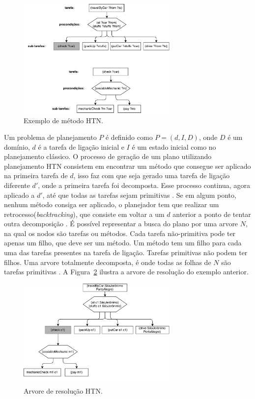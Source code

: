 \begin{figure}[ht]
	\centering
	\includegraphics[width=0.7\textwidth]{fig/htnmethod.pdf}
	\caption{Exemplo de método HTN.}
	\label{fig:htnmethod}
\end{figure} 

Um problema de planejamento $P$ é definido como $P = (d, I, D)$, onde $D$ é um domínio, $d$ é a tarefa de ligação inicial e $I$ é um estado inicial como no planejamento clássico. O processo de geração de um plano utilizando planejamento HTN consistem em encontrar um método que consegue ser aplicado na primeira tarefa de $d$, isso faz com que seja gerado uma tarefa de ligação diferente $d'$, onde a primeira tarefa foi decomposta. Esse processo continua, agora aplicado a $d'$, até que todas as tarefas sejam primitivas \cite{meneguzzi2015planning}. Se em algum ponto, nenhum método consiga ser aplicado, o planejador tem que realizar um retrocesso(\textit{backtracking}), que consiste em voltar a um $d$ anterior a ponto de tentar outra decomposição \cite{intelligence2003modern}. É possível representar a busca do plano por uma arvore $N$, na qual os nodos são tarefas ou métodos. Cada tarefa não-primitiva pode ter apenas um filho, que deve ser um método. Um método tem um filho para cada uma das tarefas presentes na tarefa de ligação. Tarefas primitivas não podem ter filhos. Uma arvore totalmente decomposta, é onde todas as folhas de $N$ são tarefas primitivas \cite{ontanon2015adversarial}. A Figura~\ref{fig:htnmethodtree} ilustra a arvore de resolução do exemplo anterior.

\begin{figure}[ht]
	\centering
	\includegraphics[width=0.7\textwidth]{fig/htnmethodresult.pdf}
	\caption{Arvore de resolução HTN.}
	\label{fig:htnmethodtree}
\end{figure}

